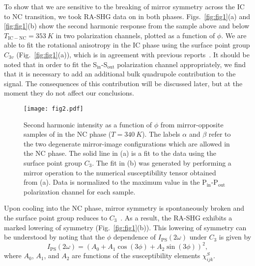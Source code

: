 To show that we are sensitive to the breaking of mirror symmetry across the IC to NC transition, we took RA-SHG data on \tastwo in both phases.
Figs.~\ref{fig:fig1}(a) and \ref{fig:fig1}(b) show the second harmonic response from the sample above and below $T_{\mathrm{IC-NC}} = \qty{353}{K}$ in two polarization channels, plotted as a function of $\phi$.
We are able to fit the rotational anisotropy in the IC phase using the surface point group $C_{3v}$ (Fig.~\ref{fig:fig1}(a)), which is in agreement with previous reports~\cite{scruby_role_1975, fung_application_1980}.
It should be noted that in order to fit the S$_\mathrm{in}$-S$_\mathrm{out}$ polarization channel appropriately, we find that it is necessary to add an additional bulk quadrupole contribution to the signal.
The consequences of this contribution will be discussed later, but at the moment they do not affect our conclusions.

\begin{figure}
\texttt{[image: fig2.pdf]}
\caption{\label{fig:fig2}Second harmonic intensity as a function of $\phi$ from mirror-opposite samples of \tastwo in the NC phase ($T=\qty{340}{K}$).
The labels $\alpha$ and $\beta$ refer to the two degenerate mirror-image configurations which are allowed in the NC phase.
The solid line in (a) is a fit to the data using the surface point group $C_3$.
The fit in (b) was generated by performing a mirror operation\cite{supplementary_materials} to the numerical susceptibility tensor obtained from (a).
Data is normalized to the maximum value in the P$_\mathrm{in}$-P$_\mathrm{out}$ polarization channel for each sample.}
\end{figure}

Upon cooling into the NC phase, mirror symmetry is spontaneously broken and the surface point group reduces to $C_3$~\cite{spijkerman_x-ray_1997}.
As a result, the RA-SHG exhibits a marked lowering of symmetry (Fig.~\ref{fig:fig1}(b)).
This lowering of symmetry can be understood by noting that the $\phi$ dependence of $I_\mathrm{PS}(2\omega)$ under $C_3$ is given by\cite{supplementary_materials}
\begin{equation}
\label{eq:intensityequation}
I_\mathrm{PS}(2\omega) = (A_0 + A_1\cos{(3\phi)} + A_2\sin{(3\phi)})^2,
\end{equation}
where $A_0$, $A_1$, and $A_2$ are functions of the susceptibility elements $\chi^S_{ijk}$.


